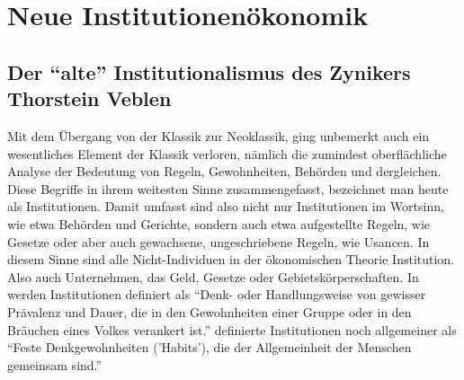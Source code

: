 %
%
%

\chapter{Neue Institutionenökonomik}
\label{Neue Institut}

\section{Der "`alte"' Institutionalismus des Zynikers Thorstein Veblen}

Mit dem Übergang von der Klassik zur Neoklassik, ging unbemerkt auch ein wesentliches Element der Klassik verloren, nämlich die zumindest oberflächliche Analyse der Bedeutung von Regeln, Gewohnheiten, Behörden und dergleichen. Diese Begriffe in ihrem weitesten Sinne zusammengefasst, bezeichnet man heute als Institutionen. Damit umfasst sind also nicht nur Institutionen im Wortsinn, wie etwa Behörden und Gerichte, sondern auch etwa aufgestellte Regeln, wie Gesetze oder aber auch gewachsene, ungeschriebene Regeln, wie Usancen. In diesem Sinne sind alle Nicht-Individuen in der ökonomischen Theorie Institution. Also auch Unternehmen, das Geld, Gesetze oder Gebietskörperschaften. In \textcite[S. 179]{Hodgson1998} werden Institutionen definiert als "`Denk- oder Handlungsweise von gewisser Prävalenz und Dauer, die in den Gewohnheiten einer Gruppe oder in den Bräuchen eines Volkes verankert ist."' \textcite[S. 239]{Veblen1919} definierte Institutionen noch allgemeiner als "`Feste Denkgewohnheiten ('Habits'), die der Allgemeinheit der Menschen gemeinsam sind."'

